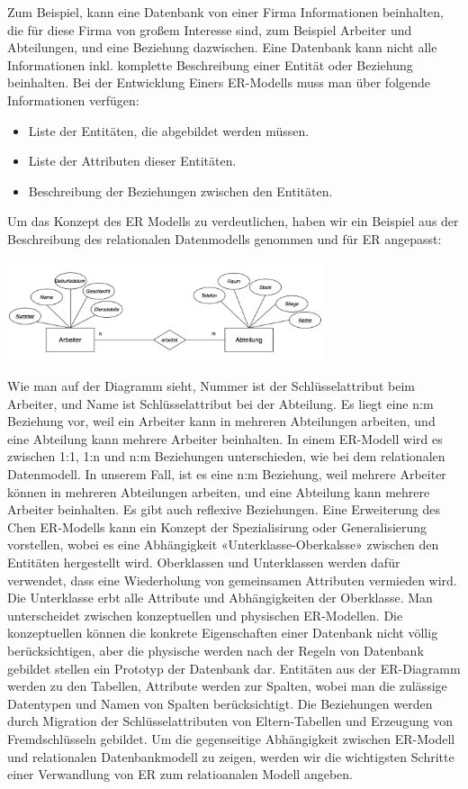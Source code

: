 Zum Beispiel, kann eine Datenbank von einer Firma Informationen beinhalten, die für diese Firma von großem Interesse sind, zum Beispiel Arbeiter und Abteilungen, und eine Beziehung dazwischen. Eine Datenbank kann nicht alle Informationen inkl. komplette Beschreibung einer Entität oder Beziehung beinhalten. Bei der Entwicklung Einers ER-Modells muss man über folgende Informationen verfügen:
 \begin{itemize}
\item  Liste der Entitäten, die abgebildet werden müssen.
\item  Liste der Attributen dieser Entitäten.
\item  Beschreibung der Beziehungen zwischen den Entitäten.
\end{itemize}

Um das Konzept des ER Modells zu verdeutlichen, haben wir ein Beispiel aus der Beschreibung des relationalen Datenmodells genommen und für ER angepasst:

\begin{center}
\includegraphics[width=0.7\textwidth]{images/ER.png}
\end{center}

Wie man auf der Diagramm sieht, Nummer ist der Schlüsselattribut beim Arbeiter, und Name ist Schlüsselattribut bei der Abteilung. Es liegt eine n:m Beziehung vor, weil ein Arbeiter kann in mehreren Abteilungen arbeiten, und eine Abteilung kann mehrere Arbeiter beinhalten. 
	In einem ER-Modell wird es zwischen 1:1, 1:n und n:m Beziehungen unterschieden, wie bei dem relationalen Datenmodell. In unserem Fall, ist es eine n:m Beziehung, weil mehrere Arbeiter können in mehreren Abteilungen arbeiten, und eine Abteilung kann mehrere Arbeiter beinhalten. Es gibt auch reflexive Beziehungen.
	Eine Erweiterung des Chen ER-Modells kann ein Konzept der Spezialisirung oder Generalisierung vorstellen, wobei es eine Abhängigkeit «Unterklasse-Oberkalsse» zwischen den Entitäten hergestellt wird. Oberklassen und Unterklassen werden dafür verwendet, dass eine Wiederholung von gemeinsamen Attributen vermieden wird. Die Unterklasse erbt alle Attribute und Abhängigkeiten der Oberklasse. 
	Man unterscheidet zwischen konzeptuellen und physischen ER-Modellen. Die konzeptuellen können die konkrete Eigenschaften einer Datenbank nicht völlig berücksichtigen, aber die physische werden nach der Regeln von Datenbank gebildet stellen ein Prototyp der Datenbank dar. Entitäten aus der ER-Diagramm werden zu den Tabellen, Attribute werden zur Spalten, wobei man die zulässige Datentypen und Namen von Spalten berücksichtigt. Die Beziehungen werden durch Migration der Schlüsselattributen von Eltern-Tabellen und Erzeugung von Fremdschlüsseln gebildet. Um die gegenseitige Abhängigkeit zwischen ER-Modell und relationalen Datenbankmodell zu zeigen, werden wir die wichtigsten Schritte einer Verwandlung von ER zum relatioanalen Modell angeben.
    
